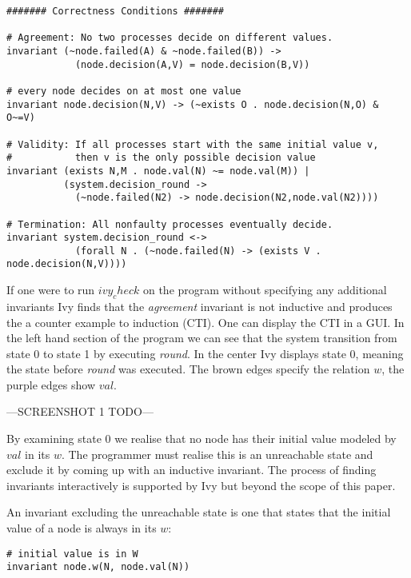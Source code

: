 \documentclass[fleqn]{article}
\begin{document}
\begin{mdframed}[backgroundcolor=light-gray, roundcorner=10pt,leftmargin=1, rightmargin=1, innerleftmargin=5, innertopmargin=15,innerbottommargin=15, outerlinewidth=1, linecolor=light-gray]
\begin{lstlisting}
####### Correctness Conditions #######

# Agreement: No two processes decide on different values.
invariant (~node.failed(A) & ~node.failed(B)) ->
            (node.decision(A,V) = node.decision(B,V))

# every node decides on at most one value
invariant node.decision(N,V) -> (~exists O . node.decision(N,O) & O~=V)

# Validity: If all processes start with the same initial value v,
#           then v is the only possible decision value
invariant (exists N,M . node.val(N) ~= node.val(M)) |
          (system.decision_round ->
            (~node.failed(N2) -> node.decision(N2,node.val(N2))))

# Termination: All nonfaulty processes eventually decide.
invariant system.decision_round <->
            (forall N . (~node.failed(N) -> (exists V . node.decision(N,V))))
\end{lstlisting}
\end{mdframed}

If one were to run $ivy_check$ on the program without specifying any
additional invariants Ivy finds that the \textit{agreement} invariant is not inductive
and produces the a counter example to induction (CTI). One can display the CTI in a GUI.
In the left hand section of the program we can see that the system transition from state 0
to state 1 by executing \textit{round}. In the center Ivy displays state 0, meaning the state
before \textit{round} was executed. The brown edges specify the relation $w$, the purple edges
show $val$.

---SCREENSHOT 1 TODO---

By examining state 0 we realise that no node has their initial value modeled by $val$
in its $w$. The programmer must realise this is an unreachable state and exclude it by coming
up with an inductive invariant. The process of finding invariants interactively is supported by Ivy but
beyond the scope of this paper.

An invariant excluding the unreachable state is one that states that the initial value of a node is always in its $w$:
\begin{mdframed}[backgroundcolor=light-gray, roundcorner=10pt,leftmargin=1, rightmargin=1, innerleftmargin=5, innertopmargin=15,innerbottommargin=15, outerlinewidth=1, linecolor=light-gray]
\begin{lstlisting}
# initial value is in W
invariant node.w(N, node.val(N))
\end{lstlisting}
\end{mdframed}
\end{document}
